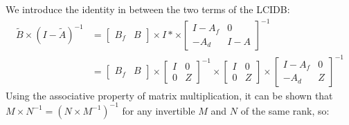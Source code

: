 We introduce the identity in between the two terms of the LCIDB:
\begin{align}
  \tilde{B}\times(I-\tilde{A})^{-1} &=
  \left[\begin{array}{cc}B_f & B\end{array}\right]\times I*  \times
  \left[\begin{array}{cc}I-A_f & 0 \\ -A_d & I-A\end{array}\right]^{-1}\\
      &=  \left[\begin{array}{cc}B_f & B\end{array}\right]\times 
      \left[\begin{array}{cc}I & 0 \\ 0 & Z\end{array}\right]^{-1}\times
      \left[\begin{array}{cc}I & 0 \\ 0 & Z\end{array}\right] \times
      \left[\begin{array}{cc}I-A_f & 0 \\ -A_d & Z\end{array}\right]^{-1}
\end{align}
Using the associative property of matrix multiplication, it can be shown that $M\times N^{-1} = (N\times M^{-1})^{-1}$ for any invertible $M$ and $N$ of the same rank, so:
